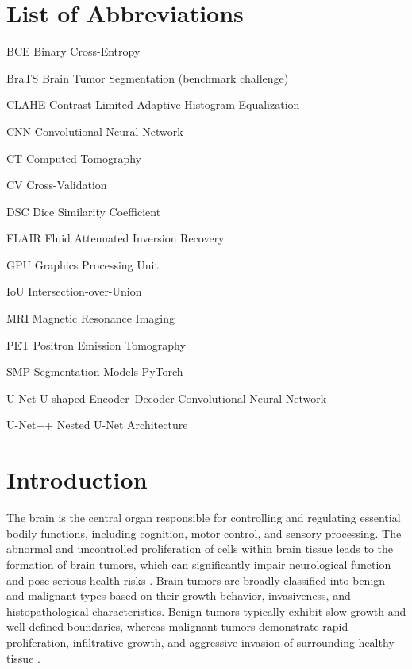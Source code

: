 \documentclass[a4paper,12pt]{article}
\newenvironment{abbrv}{%
  \begin{list}{}{%
    \setlength{\labelwidth}{2.5cm}%
    \setlength{\leftmargin}{3.2cm}%
    \setlength{\labelsep}{0.5cm}%
    \setlength{\itemsep}{3pt}%
    \renewcommand{\makelabel}[1]{\textbf{##1}\hfil}%
  }%
}{%
  \end{list}%
}
\begin{document}
\section*{List of Abbreviations}
\begin{abbrv}
    \item[BCE]      Binary Cross-Entropy
    \item[BraTS]    Brain Tumor Segmentation (benchmark challenge)
    \item[CLAHE]    Contrast Limited Adaptive Histogram Equalization
    \item[CNN]      Convolutional Neural Network
    \item[CT]       Computed Tomography
    \item[CV]       Cross-Validation
    \item[DSC]      Dice Similarity Coefficient
    \item[FLAIR]    Fluid Attenuated Inversion Recovery
    \item[GPU]      Graphics Processing Unit
    \item[IoU]      Intersection-over-Union
    \item[MRI]      Magnetic Resonance Imaging
    \item[PET]      Positron Emission Tomography
    \item[SMP]      Segmentation Models PyTorch
    \item[U-Net]    U-shaped Encoder--Decoder Convolutional Neural Network
    \item[U-Net++]  Nested U-Net Architecture
\end{abbrv}

\newpage
{}
\setcounter{page}{1}


\section{Introduction}
\label{sec:introduction}

The brain is the central organ responsible for controlling and regulating essential bodily
functions, including cognition, motor control, and sensory processing. The abnormal and
uncontrolled proliferation of cells within brain tissue leads to the formation of brain tumors,
which can significantly impair neurological function and pose serious health risks
\cite{louis2021who}. Brain tumors are broadly classified into benign and malignant types based
on their growth behavior, invasiveness, and histopathological characteristics. Benign tumors
typically exhibit slow growth and well-defined boundaries, whereas malignant tumors demonstrate
rapid proliferation, infiltrative growth, and aggressive invasion of surrounding healthy tissue
\cite{who2021tumors}.
\end{document}
